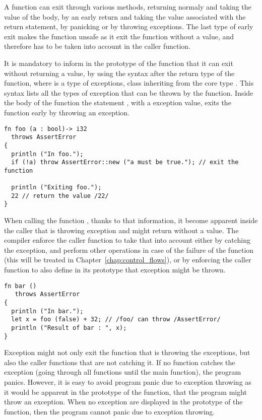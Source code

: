 A function can exit through various methods, returning normaly and taking the
value of the body, by an early return and taking the value associated with the
return statement, by panicking or by throwing exceptions. The last type of early
exit makes the function unsafe as it exit the function without a value, and
therefore has to be taken into account in the caller function.

It is mandatory to inform in the prototype of the function that it can exit
without returning a value, by using the syntax  after
the return type of the function, where  is a type of exceptions, class
inheriting from the core type . This syntax
lists all the types of exception that can be thrown by the function. Inside the
body of the function the statement , with  a
exception value, exits the function early by throwing an exception.

\begin{lstlisting}[style=coloredverbatim]
fn foo (a : bool)-> i32
  throws AssertError
{
  println ("In foo.");
  if (!a) throw AssertError::new ("a must be true."); // exit the function

  println ("Exiting foo.");
  22 // return the value /22/
}
\end{lstlisting}

When calling the function , thanks to that information, it become
apparent inside the caller that  is throwing exception and might
return without a value. The compiler enforce the caller function to take that
into account either by catching the exception, and perform other operations in
case of the failure of the function  (this will be treated in
Chapter~\ref{chap:control_flows}), or by enforcing the caller function to also
define in its prototype that exception might be thrown.

\begin{lstlisting}[style=coloredverbatim]
fn bar ()
   throws AssertError
{
  println ("In bar.");
  let x = foo (false) + 32; // /foo/ can throw /AssertError/
  println ("Result of bar : ", x);
}
\end{lstlisting}

Exception might not only exit the function that is throwing the exceptions, but
also the caller functions that are not catching it. If no function catches the
exception (going through all functions until the main function), the program
panics. However, it is easy to avoid program panic due to exception throwing as
it would be apparent in the prototype of the  function, that the
program might throw an exception. When no exception are displayed in the
prototype of the  function, then the program cannot panic due to
exception throwing.

